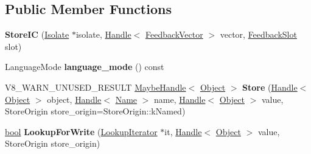 \subsection*{Public Member Functions}
\begin{DoxyCompactItemize}
\item 
\mbox{\label{classv8_1_1internal_1_1StoreIC_aa32ab2bc8c6ff46379e549f10baaa15b}} 
{\bfseries Store\+IC} (\mbox{\hyperlink{classv8_1_1internal_1_1Isolate}{Isolate}} $\ast$isolate, \mbox{\hyperlink{classv8_1_1internal_1_1Handle}{Handle}}$<$ \mbox{\hyperlink{classv8_1_1internal_1_1FeedbackVector}{Feedback\+Vector}} $>$ vector, \mbox{\hyperlink{classv8_1_1internal_1_1FeedbackSlot}{Feedback\+Slot}} slot)
\item 
\mbox{\label{classv8_1_1internal_1_1StoreIC_a342572d965c80ab43e211b5b8d4cbc11}} 
Language\+Mode {\bfseries language\+\_\+mode} () const
\item 
\mbox{\label{classv8_1_1internal_1_1StoreIC_a598da0822e7fcfb481521b3144c2a4b1}} 
V8\+\_\+\+W\+A\+R\+N\+\_\+\+U\+N\+U\+S\+E\+D\+\_\+\+R\+E\+S\+U\+LT \mbox{\hyperlink{classv8_1_1internal_1_1MaybeHandle}{Maybe\+Handle}}$<$ \mbox{\hyperlink{classv8_1_1internal_1_1Object}{Object}} $>$ {\bfseries Store} (\mbox{\hyperlink{classv8_1_1internal_1_1Handle}{Handle}}$<$ \mbox{\hyperlink{classv8_1_1internal_1_1Object}{Object}} $>$ object, \mbox{\hyperlink{classv8_1_1internal_1_1Handle}{Handle}}$<$ \mbox{\hyperlink{classv8_1_1internal_1_1Name}{Name}} $>$ name, \mbox{\hyperlink{classv8_1_1internal_1_1Handle}{Handle}}$<$ \mbox{\hyperlink{classv8_1_1internal_1_1Object}{Object}} $>$ value, Store\+Origin store\+\_\+origin=Store\+Origin\+::k\+Named)
\item 
\mbox{\label{classv8_1_1internal_1_1StoreIC_a8d34cb19693bca06d23d87de563bb60d}} 
\mbox{\hyperlink{classbool}{bool}} {\bfseries Lookup\+For\+Write} (\mbox{\hyperlink{classv8_1_1internal_1_1LookupIterator}{Lookup\+Iterator}} $\ast$it, \mbox{\hyperlink{classv8_1_1internal_1_1Handle}{Handle}}$<$ \mbox{\hyperlink{classv8_1_1internal_1_1Object}{Object}} $>$ value, Store\+Origin store\+\_\+origin)
\end{DoxyCompactItemize}
